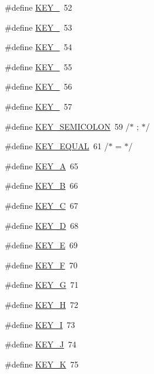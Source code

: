 \begin{DoxyCompactItemize}
\#define \hyperlink{group___keys_ga219891753a1b6ccd51c8ae763905dbf9}{K\-E\-Y\-\_}~52
\item 
\#define \hyperlink{group___keys_ga8520da12c76efb8ca95ca2068d1ca35c}{K\-E\-Y\-\_}~53
\item 
\#define \hyperlink{group___keys_ga4ab32ce5ef6b5d115253d2a712f2e19b}{K\-E\-Y\-\_}~54
\item 
\#define \hyperlink{group___keys_ga5895875bee3ae13b13cdb5e85b45161b}{K\-E\-Y\-\_}~55
\item 
\#define \hyperlink{group___keys_gad2888e35bf1cbd0b25c3e82bc360c647}{K\-E\-Y\-\_}~56
\item 
\#define \hyperlink{group___keys_gae6838379f118dfbfc78d82fcd8886a41}{K\-E\-Y\-\_}~57
\item 
\#define \hyperlink{group___keys_gaaaf77eb9716854e4838799c5d2bd26a5}{K\-E\-Y\-\_\-\-S\-E\-M\-I\-C\-O\-L\-O\-N}~59  /$\ast$ ; $\ast$/
\item 
\#define \hyperlink{group___keys_gae83cfa48ed6b7c324e233c6603a9bea4}{K\-E\-Y\-\_\-\-E\-Q\-U\-A\-L}~61  /$\ast$ = $\ast$/
\item 
\#define \hyperlink{group___keys_ga024e62650f02bfd64a4ce2b158ec2dd7}{K\-E\-Y\-\_\-\-A}~65
\item 
\#define \hyperlink{group___keys_gad2ae94d1ffed5c399aa6f8c40c0fc3c7}{K\-E\-Y\-\_\-\-B}~66
\item 
\#define \hyperlink{group___keys_ga21db833332c950e74a8d5cd79ebffc8d}{K\-E\-Y\-\_\-\-C}~67
\item 
\#define \hyperlink{group___keys_gad2017b35fcff527a10050ab7c9af2d5c}{K\-E\-Y\-\_\-\-D}~68
\item 
\#define \hyperlink{group___keys_ga76fcab7ae716facf6eefcee03457fe7d}{K\-E\-Y\-\_\-\-E}~69
\item 
\#define \hyperlink{group___keys_gacc696937f28ef5bdd90eeb8addd0ef82}{K\-E\-Y\-\_\-\-F}~70
\item 
\#define \hyperlink{group___keys_gac38f385af8c9c0b21678f07b55f28edf}{K\-E\-Y\-\_\-\-G}~71
\item 
\#define \hyperlink{group___keys_gac7cfd77bb9d2d498bbf591be4420f7a8}{K\-E\-Y\-\_\-\-H}~72
\item 
\#define \hyperlink{group___keys_ga31ae832a3de882f92710ed9cb0b46e0a}{K\-E\-Y\-\_\-\-I}~73
\item 
\#define \hyperlink{group___keys_ga5e90bac1d19a8a6b8bc79be340470271}{K\-E\-Y\-\_\-\-J}~74
\item 
\#define \hyperlink{group___keys_ga98a32c947983c2266dfc309eb7f3fc5c}{K\-E\-Y\-\_\-\-K}~75

\end{DoxyCompactItemize}
